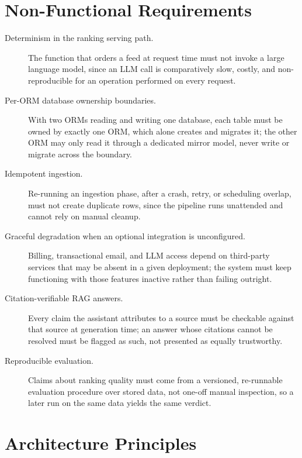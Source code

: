 \section{Non-Functional Requirements}
\label{sec:req-nonfunctional}

\begin{description}
  \item[Determinism in the ranking serving path.]
  The function that orders a feed at request time must not invoke a large
  language model, since an LLM call is comparatively slow, costly, and
  non-reproducible for an operation performed on every request.

  \item[Per-ORM database ownership boundaries.]
  With two ORMs reading and writing one database, each table must be owned
  by exactly one ORM, which alone creates and migrates it; the other ORM
  may only read it through a dedicated mirror model, never write or
  migrate across the boundary.

  \item[Idempotent ingestion.]
  Re-running an ingestion phase, after a crash, retry, or scheduling
  overlap, must not create duplicate rows, since the pipeline runs
  unattended and cannot rely on manual cleanup.

  \item[Graceful degradation when an optional integration is unconfigured.]
  Billing, transactional email, and LLM access depend on third-party
  services that may be absent in a given deployment; the system must keep
  functioning with those features inactive rather than failing outright.

  \item[Citation-verifiable RAG answers.]
  Every claim the assistant attributes to a source must be checkable
  against that source at generation time; an answer whose citations cannot
  be resolved must be flagged as such, not presented as equally
  trustworthy.

  \item[Reproducible evaluation.]
  Claims about ranking quality must come from a versioned, re-runnable
  evaluation procedure over stored data, not one-off manual inspection, so
  a later run on the same data yields the same verdict.
\end{description}

\section{Architecture Principles}
\label{sec:req-principles}

